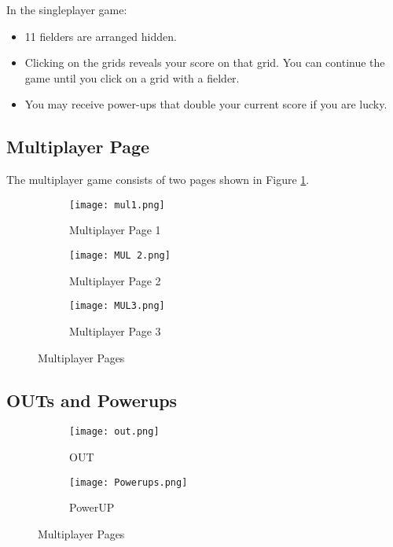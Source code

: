 \documentclass[a4paper, 11pt]{article}
\begin{document}
In the singleplayer game:
\begin{itemize}
    \item 11 fielders are arranged hidden.
    \item Clicking on the grids reveals your score on that grid. You can continue the game until you click on a grid with a fielder.
    \item You may receive power-ups that double your current score if you are lucky.
\end{itemize}

\subsection{Multiplayer Page}
The multiplayer game consists of two pages shown in Figure \ref{fig:multiplayer-pages}.

\begin{figure}[h!]
    \centering
    \begin{subfigure}[b]{0.5\textwidth}
        \texttt{[image: mul1.png]}
        \caption{Multiplayer Page 1}
    \end{subfigure}
    \hfill
    \begin{subfigure}[b]{0.4\textwidth}
        \texttt{[image: MUL 2.png]}
        \caption{Multiplayer Page 2}
    \end{subfigure}
    \hfill
    \begin{subfigure}[b]{0.4\textwidth}
        \texttt{[image: MUL3.png]}
        \caption{Multiplayer Page 3}
    \end{subfigure}
    \caption{Multiplayer Pages}
    \label{fig:multiplayer-pages}
\end{figure}
\pagebreak
\subsection{OUTs and Powerups}
\begin{figure}[h!]
    \centering
    \begin{subfigure}[b]{0.5\textwidth}
        \texttt{[image: out.png]}
        \caption{OUT}
    \end{subfigure}
    \hfill
    \begin{subfigure}[b]{0.4\textwidth}
        \texttt{[image: Powerups.png]}
        \caption{PowerUP}
    \end{subfigure}
        \caption{Multiplayer Pages}
    \label{fig:OUTs and Powerups}
\end{figure}
\end{document}
